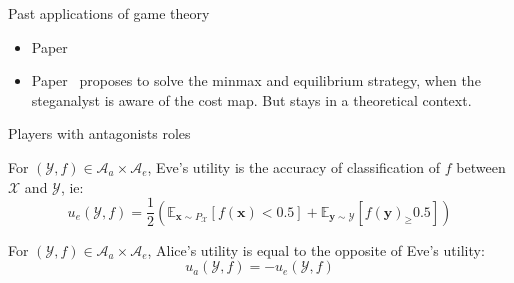 \documentclass[10pt,aspectratio=169]{beamer}
\begin{document}
\begin{frame}{Past applications of game theory}

    \begin{itemize}
        \item Paper~
        \item Paper~ proposes to solve the minmax and equilibrium strategy, when the steganalyst is aware of the cost map. But stays in a theoretical context.
    \end{itemize}
    
\end{frame}






\begin{frame}{Players with antagonists roles}

    \begin{tcolorbox}[colback=lightgreen,colframe=greentheme,title=\textbf{Definition} (Eve's utility)]
        For $(\mathcal{Y}, f)  \in \mathcal{A}_a \times \mathcal{A}_e$, Eve's utility is the accuracy of classification of $f$ between $\mathcal{X}$ and $\mathcal{Y}$, ie:
            \begin{equation}
                u_e(\mathcal{Y}, f) = \frac{1}{2} \left(\mathbb{E}_{\mathbf{x}\sim P_{\mathcal{X}}}[f(\mathbf{x}) < 0.5] + \mathbb{E}_{\mathbf{y} \sim \mathcal{Y}}[f(\mathbf{y})_ \geq 0.5] \right)
            \end{equation}
    \end{tcolorbox}

    \pause
    \begin{tcolorbox}[colback=lightgreen,colframe=greentheme,title=\textbf{Definition} (Alice's utility)]
        For $(\mathcal{Y}, f)  \in \mathcal{A}_a \times \mathcal{A}_e$, Alice's utility is equal to the opposite of Eve's utility:
            \begin{equation}
                u_a(\mathcal{Y}, f) = - u_e(\mathcal{Y}, f)
            \end{equation}
    \end{tcolorbox}

\end{frame}
\end{document}
